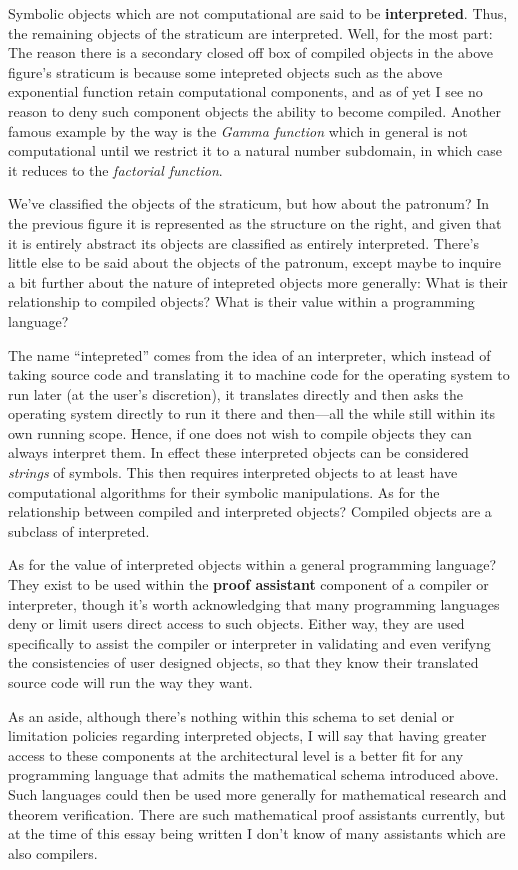 \documentclass[twoside]{article}
\newcommand{\strong}[1]{{\bfseries #1}}
\begin{document}
Symbolic objects which are not computational are said to be \strong{interpreted}. Thus, the remaining objects of the straticum
are interpreted. Well, for the most part: The reason there is a secondary closed off box of compiled objects in the above
figure's straticum is because some intepreted objects such as the above exponential function retain computational components,
and as of yet I see no reason to deny such component objects the ability to become compiled. Another famous example by the way
is the \emph{Gamma function} which in general is not computational until we restrict it to a natural number subdomain,
in which case it reduces to the \emph{factorial function}.

We've classified the objects of the straticum, but how about the patronum? In the previous figure it is represented as the
structure on the right, and given that it is entirely abstract its objects are classified as entirely interpreted. There's
little else to be said about the objects of the patronum, except maybe to inquire a bit further about the nature of intepreted
objects more generally: What is their relationship to compiled objects? What is their value within a programming language?

The name ``intepreted'' comes from the idea of an interpreter, which instead of taking source code and translating it to machine
code for the operating system to run later (at the user's discretion), it translates directly and then asks the operating system
directly to run it there and then---all the while still within its own running scope. Hence, if one does not wish to compile objects
they can always interpret them. In effect these interpreted objects can be considered \emph{strings} of symbols. This then requires
interpreted objects to at least have computational algorithms for their symbolic manipulations. As for the relationship between
compiled and interpreted objects? Compiled objects are a subclass of interpreted.

As for the value of interpreted objects within a general programming language? They exist to be used within the \strong{proof
assistant} component of a compiler or interpreter, though it's worth acknowledging that many programming languages deny or limit
users direct access to such objects. Either way, they are used specifically to assist the compiler or interpreter in validating
and even verifyng the consistencies of user designed objects, so that they know their translated source code will run the way
they want.

As an aside, although there's nothing within this schema to set denial or limitation policies regarding interpreted objects,
I will say that having greater access to these components at the architectural level is a better fit for any programming language
that admits the mathematical schema introduced above. Such languages could then be used more generally for mathematical research
and theorem verification. There are such mathematical proof assistants currently, but at the time of this essay being written
I don't know of many assistants which are also compilers.
\end{document}
